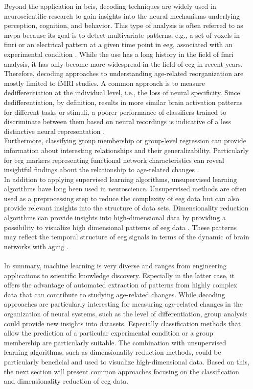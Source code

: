 Beyond the application in \glspl{bci}, decoding techniques are widely used in neuroscientific research to gain insights into the neural mechanisms underlying perception, cognition, and behavior. This type of analysis is often referred to as \gls{mvpa} because its goal is to detect multivariate patterns, e.g., a set of voxels in \gls{fmri} or an electrical pattern at a given time point in \gls{eeg}, associated with an experimental condition \cite{Holdgraf2017}. While the use has a long history in the field of \gls{fmri} analysis, it has only become more widespread in the field of \gls{eeg} in recent years. Therefore, decoding approaches to understanding age-related reorganization are mostly limited to fMRI studies. A common approach is to measure dedifferentiation at the individual level, i.e., the loss of neural specificity. Since dedifferentiation, by definition, results in more similar brain activation patterns for different tasks or stimuli, a poorer performance of classifiers trained to discriminate between them based on neural recordings is indicative of a less distinctive neural representation \cite{Koen2019, Park2010}. \\ 
Furthermore, classifying group membership or group-level regression can provide information about interesting relationships and their generalizability. Particularly for \gls{eeg} markers representing functional network characteristics can reveal insightful findings about the relationship to age-related changes \cite{Petti2016}.\\
In addition to applying supervised learning algorithms, unsupervised learning algorithms have long been used in neuroscience. Unsupervised methods are often used as a preprocessing step to reduce the complexity of \gls{eeg} data but can also provide relevant insights into the structure of data sets. Dimensionality reduction algorithms can provide insights into high-dimensional data by providing a possibility to visualize high dimensional patterns of \gls{eeg} data \cite{Kottlarz2020, Banville2021}. These patterns may reflect the temporal structure of \gls{eeg} signals in terms of the dynamic of brain networks with aging \cite{Brunton2016, vieluf2018age}.\\
\\
In summary, machine learning is very diverse and ranges from engineering applications to scientific knowledge discovery. Especially in the latter case, it offers the advantage of automated extraction of patterns from highly complex data that can contribute to studying age-related changes. While decoding approaches are particularly interesting for measuring age-related changes in the organization of neural systems, such as the level of differentiation, group analysis could provide new insights into datasets. Especially classification methods that allow the prediction of a particular experimental condition or a group membership are particularly suitable. The combination with unsupervised learning algorithms, such as dimensionality reduction methods, could be particularly beneficial and used to visualize high-dimensional data. Based on this, the next section will present common approaches focusing on the classification and dimensionality reduction of \gls{eeg} data. 



